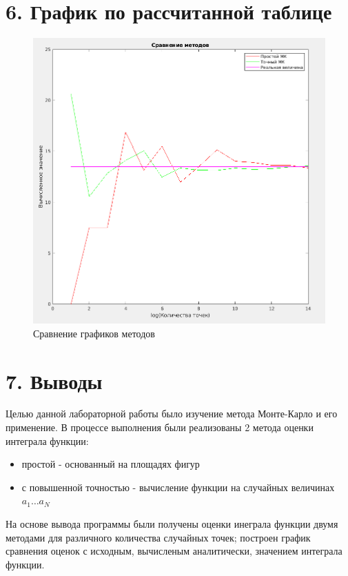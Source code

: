 \documentclass[12pt]{article}
\begin{document}
\newpage
 \section*{6. График по рассчитанной таблице}
 
\begin{figure}[!h]
	\centering
	\includegraphics[width=\linewidth]{MK_compare_graph.png}
	\caption{Сравнение графиков методов}
\end{figure}

\newpage
 \section*{7. Выводы}
Целью данной лабораторной работы было изучение метода Монте-Карло и его применение. В процессе выполнения были реализованы 2 метода оценки интеграла функции: 

\begin{itemize}
	\item простой - основанный на площадях фигур
	\item с повышенной точностью - вычисление функции на случайных величинах $a_1\dots a_N$
\end{itemize}

На основе вывода программы были получены оценки инеграла функции двумя методами для различного количества случайных точек; построен график сравнения оценок с исходным, вычисленым аналитически, значением интеграла функции.
\end{document}
